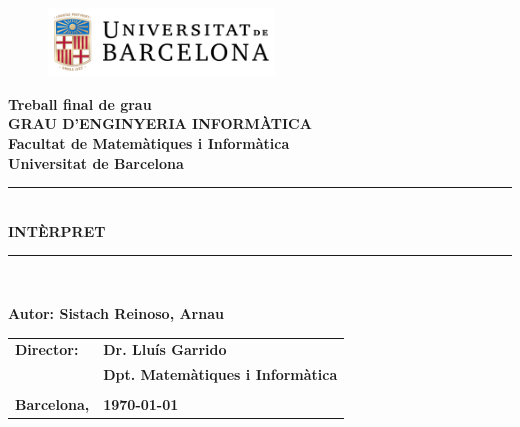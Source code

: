 \begin{titlepage}
\begin{center}
    \begin{figure}[htb]
        \centering
        \includegraphics[width=6cm]{ub_color.pdf}
    \end{figure}
    \textbf{\LARGE Treball final de grau}\\
    \vspace*{.5cm}
    \textbf{\LARGE GRAU D'ENGINYERIA INFORMÀTICA }\\
    \vspace*{.5cm}
    \textbf{\LARGE Facultat de Matemàtiques i Informàtica\\ Universitat de Barcelona}\\
    \vspace*{1.5cm}
    
    \rule{\textwidth}{.1mm}\\[3mm]
    \textbf{\Huge INTÈRPRET}\\
    \rule{\textwidth}{.1mm}\\[1cm]
\end{center}

\begin{flushright}
    \textbf{\LARGE Autor: Sistach Reinoso, Arnau}\\[2cm]
    
    \begin{tabular}{ll}
        \textbf{\Large Director:} & \textbf{\Large Dr. Lluís Garrido } \\
        & \textbf{\Large Dpt. Matemàtiques i Informàtica}\\
        \\
        \textbf{\Large Barcelona,} & \textbf{\Large \today }
    \end{tabular}
\end{flushright}

\end{titlepage}